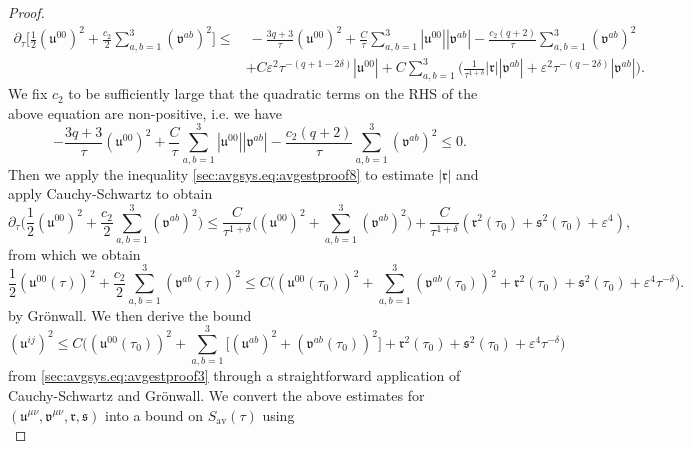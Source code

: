 \documentclass{article}
\newcommand{\av}{\mathrm{av}}
\newcommand{\mf}{\mathfrak}
\newcommand{\ve}{\varepsilon}
\newcommand{\pa}{\partial}
\begin{document}
\begin{proof}
    \begin{align}
        \pa_\tau\Big[\frac{1}{2}(\mf{u}^{00})^2 + \frac{c_2}{2} \sum_{a,b=1}^3(\mf{v}^{ab})^2\Big] \leq &\> -\frac{3q+3}{\tau}(\mf{u}^{00})^2 + \frac{C}{\tau}\sum_{a,b=1}^3 |\mf{u}^{00}||\mf{v}^{ab}| - \frac{c_2(q+2)}{\tau}\sum_{a,b=1}^3(\mf{v}^{ab})^2\nonumber\\
        &+ C\ve^2\tau^{-(q+1-2\delta)}|\mf{u}^{00}| + C\sum_{a,b=1}^3\Big(\frac{1}{\tau^{1+\delta}}|\mf{r}||\mf{v}^{ab}| + \ve^2\tau^{-(q-2\delta)}|\mf{v}^{ab}|\Big).
    \end{align}
    We fix $c_2$ to be sufficiently large that the quadratic terms on the RHS of the above equation are non-positive, i.e. we have
    \begin{equation}
        -\frac{3q+3}{\tau}(\mf{u}^{00})^2 + \frac{C}{\tau}\sum_{a,b=1}^3 |\mf{u}^{00}||\mf{v}^{ab}| - \frac{c_2(q+2)}{\tau}\sum_{a,b=1}^3(\mf{v}^{ab})^2 \leq 0.
    \end{equation}
    Then we apply the inequality \eqref{sec:avgsys.eq:avgestproof8} to estimate $|\mf{r}|$ and apply Cauchy-Schwartz to obtain
    \begin{equation}
        \pa_\tau\Big(\frac{1}{2}(\mf{u}^{00})^2 + \frac{c_2}{2} \sum_{a,b=1}^3(\mf{v}^{ab})^2\Big) \leq \frac{C}{\tau^{1+\delta}}\Big((\mf{u}^{00})^2+\sum_{a,b=1}^3(\mf{v}^{ab})^2\Big) + \frac{C}{\tau^{1+\delta}}(\mf{r}^2(\tau_0)+\mf{s}^2(\tau_0)+\ve^4),
    \end{equation}
    from which we obtain
    \begin{equation}\label{sec:avgsys.eq:avgestproof9}
        \frac{1}{2}(\mf{u}^{00}(\tau))^2 + \frac{c_2}{2} \sum_{a,b=1}^3(\mf{v}^{ab}(\tau))^2 \leq C\Big((\mf{u}^{00}(\tau_0))^2 + \sum_{a,b=1}^3(\mf{v}^{ab}(\tau_0))^2 + \mf{r}^2(\tau_0) +\mf{s}^2(\tau_0) + \ve^4\tau^{-\delta}\Big).
    \end{equation}
    by Gr\"onwall. We then derive the bound
    \begin{equation}\label{sec:avgsys.eq:avgestproof10}
        (\mf{u}^{ij})^2 \leq C\Big((\mf{u}^{00}(\tau_0))^2 + \sum_{a,b=1}^3\big[(\mf{u}^{ab})^2+(\mf{v}^{ab}(\tau_0))^2\big] + \mf{r}^2(\tau_0) +\mf{s}^2(\tau_0) + \ve^4\tau^{-\delta}\Big)
    \end{equation}
    from \eqref{sec:avgsys.eq:avgestproof3} through a straightforward application of Cauchy-Schwartz and Gr\"onwall. We convert the above estimates for $(\mf{u}^{\mu\nu},\mf{v}^{\mu\nu},\mf{r},\mf{s})$ into a bound on $S_{\av}(\tau)$ using
    \begin{subequations}

\end{subequations}
\end{proof}
\end{document}

